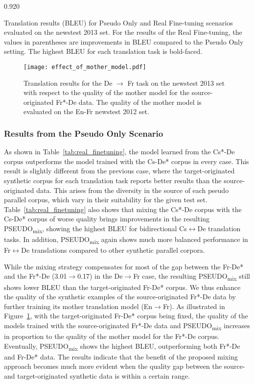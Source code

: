 \documentclass[11pt,letterpaper]{article}
\newcommand{\mylinespacing}{0.920}
\begin{document}
\begin{spacing}{\mylinespacing}
\begin{table*}[t]
\caption{Translation results (BLEU) for Pseudo Only and Real Fine-tuning scenarios evaluated on the newstest 2013 set. For the results of the Real Fine-tuning, the values in parentheses are improvements in BLEU compared to the Pseudo Only setting. The highest BLEU for each translation task is bold-faced.}
\label{tab:real_finetuning}
\end{table*}

\begin{figure}[t]
	\centering
    \texttt{[image: effect\_of\_mother\_model.pdf]}
    \caption{Translation results for the De \(\rightarrow\) Fr task on the newstest 2013 set with respect to the quality of the mother model for the source-originated Fr*-De data. The quality of the mother model is evaluated on the En-Fr newstest 2012 set.}
    \label{fig:effect_of_mother_model}
\end{figure}

\subsubsection{Results from the Pseudo Only Scenario}
As shown in Table~\ref{tab:real_finetuning}, the model learned from the Cs*-De corpus outperforms the model trained with the Cs-De* corpus in every case. This result is slightly different from the previous case, where the target-originated synthetic corpus for each translation task reports better results than the source-originated data. This arises from the diversity in the source of each pseudo parallel corpus, which vary in their suitability for the given test set. Table~\ref{tab:real_finetuning} also shows that mixing the Cs*-De corpus with the Cs-De* corpus of worse quality brings improvements in the resulting PSEUDO\textsubscript{mix}, showing the highest BLEU for bidirectional Cs\(\leftrightarrow\)De translation tasks. In addition, PSEUDO\textsubscript{mix} again shows much more balanced performance in Fr\(\leftrightarrow\)De translations compared to other synthetic parallel corpora.

While the mixing strategy compensates for most of the gap between the Fr-De* and the Fr*-De (3.01\(\rightarrow\)0.17) in the De\(\rightarrow\)Fr case, the resulting PSEUDO\textsubscript{mix} still shows lower BLEU than the target-originated Fr-De* corpus. We thus enhance the quality of the synthetic examples of the source-originated Fr*-De data by further training its mother translation model (En\(\rightarrow\)Fr). As illustrated in Figure~\ref{fig:effect_of_mother_model}, with the target-originated Fr-De* corpus being fixed, the quality of the models trained with the source-originated Fr*-De data and PSEUDO\textsubscript{mix} increases in proportion to the quality of the mother model for the Fr*-De corpus. Eventually, PSEUDO\textsubscript{mix} shows the highest BLEU, outperforming both Fr*-De and Fr-De* data. The results indicate that the benefit of the proposed mixing approach becomes much more evident when the quality gap between the source- and target-originated synthetic data is within a certain range.



\end{spacing}
\end{document}
